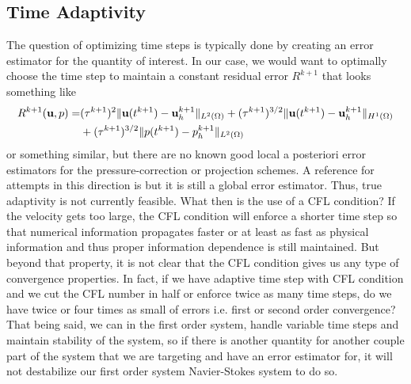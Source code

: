 \documentclass[letterpaper]{erdc}
\begin{document}
\subsection{Time Adaptivity}
The question of optimizing time steps is typically done by creating an error
estimator for the quantity of interest.  In our case, we would want to
optimally choose the time step to maintain a constant residual error $R^{k+1}$
that looks something like
\begin{equation}\begin{split}
  R^{k+1}(\textbf{u},p) = &(\tau^{k+1})^2\|\textbf{u}(t^{k+1})-\textbf{u}^{k+1}_h\|_{L^2(\Omega)} + (\tau^{k+1})^{3/2}\|\textbf{u}(t^{k+1})-\textbf{u}^{k+1}_h\|_{H^1(\Omega)} \\&+ (\tau^{k+1})^{3/2}\|p(t^{k+1})-p^{k+1}_h\|_{L^2(\Omega)}\end{split}
  \end{equation}
  or something similar, but there are no known good local a posteriori error
  estimators for the pressure-correction or projection schemes.  A reference
  for attempts in this direction is \cite{boyaval2013posteriori} but it is
  still a global error estimator.  Thus, true adaptivity is not currently
  feasible.  What then is the use of a CFL condition?  If the velocity gets too
  large, the CFL condition will enforce a shorter time step so that numerical
  information propagates faster or at least as fast as physical information and
  thus proper information dependence is still maintained.  But beyond that
  property, it is not clear that the CFL condition gives us any type of
  convergence properties.  In fact, if we have adaptive time step with CFL
  condition and we cut the CFL number in half or enforce twice as many time
  steps, do we have twice or four times as small of errors i.e. first or second
  order convergence?  That being said, we can in the first order system, handle
  variable time steps and maintain stability of the system, so if there is
  another quantity for another couple part of the system that we are targeting
  and have an error estimator for, it will not destabilize our first order
  system Navier-Stokes system to do so.



%
%
%
\end{document}
